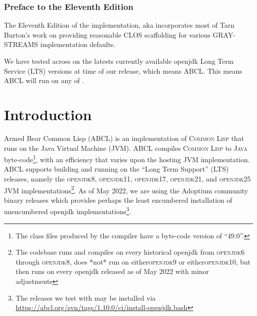 \documentclass[10pt]{book}
\begin{document}
\subsection{Preface to the Eleventh Edition}

The Eleventh Edition of the implementation, aka  incorporates
most of Tarn Burton's work on providing reasonable \textsc{CLOS} scaffolding
for various \textsc{GRAY-STREAMS} implementation defaults.

We have tested across on the latests currently available openjdk Long
Term Service (LTS) versions at time of our release, which means ABCL.
This means ABCL will run on any of .  

\chapter{Introduction}

Armed Bear Common Lisp (\textsc{ABCL}) is an implementation of
\textsc{Common Lisp} that runs on the Java Virtual Machine
(\textsc{JVM}).  \textsc{ABCL} compiles \textsc{Common Lisp} to
\textsc{Java} byte-code\footnote{The class files produced by the
compiler have a byte-code version of ``49.0''.}, with an efficiency
that varies upon the hosting JVM implementation.  \textsc{ABCL}
supports building and running on the ``Long Term Support'' (LTS) releases, namely the \textsc{openjdk8},
\textsc{openjdk11}, \textsc{openjdk17}, \textsc{openjdk21}, and
\textsc{openjdk25} \textsc{JVM} implementations\footnote{The codebase
runs and compiles on every historical openjdk from \textsc{openjdk6}
through \textsc{openjdk8}, does *not* run on either\textsc{openjdk9}
or either\textsc{openjdk10}, but then runs on every openjdk released
as of May 2022 with minor adjustments}.  As of May 2022, we are using
the Adoptium community \cite{adoptium} binary releases which provides
perhaps the least encumbered installation of unencumbered openjdk
implementations\footnote{The releases we test with may be installed
via \url{https://abcl.org/svn/tags/1.10.0/ci/install-openjdk.bash}}.
\end{document}
